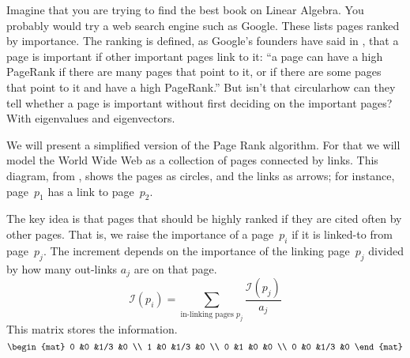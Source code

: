 
Imagine that you are trying to find the best book
on Linear Algebra.
You probably would try a web search engine such as Google.
These lists pages ranked by importance.
The ranking is defined, as Google's founders have said in \cite{BrinPage}, 
that a page is important if other important
pages link to it:
``a page can have a high PageRank if there are many pages that point
to it, or if there are some pages that point to it and have a high PageRank.''
But isn't that circular\Dash how can they tell whether a page is
important without first deciding on the important pages?
With eigenvalues and eigenvectors.

We will present a simplified version of the Page Rank algorithm. 
For that we will model the World Wide Web as a collection of pages connected by
links.
This diagram, from \cite{Wills},
shows the pages as circles, and the links as arrows;
for instance, page~$p_1$ has a link to page~$p_2$. 
\begin{center}  %
  \shortstack{\rule{0em}{1.5ex} \\ \texttt{[image: ch5.9]} \\ \rule{0em}{1.5ex}}
\end{center}

The key idea is that pages that should be highly ranked if they are
cited often by other pages.
That is, we raise the importance of a page~$p_i$
if it is linked-to from page~$p_j$.
The increment depends on the importance of the linking page~$p_j$
divided by how many out-links $a_j$ are on that page.
\begin{equation*}
  \mathcal{I}(p_i)=\sum_{\text{in-linking pages $p_j$}}  \frac{\mathcal{I}(p_j)}{a_j}
\end{equation*}
This matrix stores the information.
\begin{equation*}
  \begin{mat}
    0   &0  &1/3  &0   \\
    1   &0  &1/3  &0   \\
    0   &1  &0    &0 \\
    0   &0  &1/3  &0
  \end{mat}
\end{equation*}

